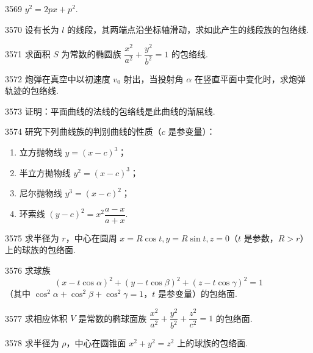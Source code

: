 \begin{prob}[S]{3569}
$y^2 = 2px + p^2$.
\end{prob}

\begin{prob}[M]{3570}
设有长为 $l$ 的线段，其两端点沿坐标轴滑动，求如此产生的线段族的包络线.
\end{prob}

\begin{prob}[M]{3571}
求面积 $S$ 为常数的椭圆族 $\dfrac{x^2}{a^2} + \dfrac{y^2}{b^2} = 1$ 的包络线.
\end{prob}

\begin{prob}[M]{3572}
炮弹在真空中以初速度 $v_0$ 射出，当投射角 $\alpha$ 在竖直平面中变化时，求炮弹轨迹的包络线.
\end{prob}

\begin{prob}[M]{3573}
证明：平面曲线的法线的包络线是此曲线的渐屈线.
\end{prob}

\begin{prob}[L]{3574}
研究下列曲线族的判别曲线的性质（$c$ 是参变量）：
\begin{enumerate}[label=(\alph*), itemsep=2pt, topsep=3pt]
\item 立方抛物线 $y = (x - c)^3$；
\item 半立方抛物线 $y^2 = (x - c)^3$；
\item 尼尔抛物线 $y^3 = (x - c)^2$；
\item 环索线 $(y - c)^2 = x^2\dfrac{a - x}{a + x}$.
\end{enumerate}
\end{prob}

\begin{prob}[M]{3575}
求半径为 $r$，中心在圆周 $x = R\cos t, y = R\sin t, z = 0$（$t$ 是参数，$R > r$）上的球族的包络面.
\end{prob}

\begin{prob}[M]{3576}
求球族
\[
(x - t\cos\alpha)^2 + (y - t\cos\beta)^2 + (z - t\cos\gamma)^2 = 1
\]
（其中 $\cos^2\alpha + \cos^2\beta + \cos^2\gamma = 1$，$t$ 是参变量）的包络面.
\end{prob}

\begin{prob}[M]{3577}
求相应体积 $V$ 是常数的椭球面族 $\dfrac{x^2}{a^2} + \dfrac{y^2}{b^2} + \dfrac{z^2}{c^2} = 1$ 的包络面.
\end{prob}

\begin{prob}[M]{3578}
求半径为 $\rho$，中心在圆锥面 $x^2 + y^2 = z^2$ 上的球族的包络面.
\end{prob}

